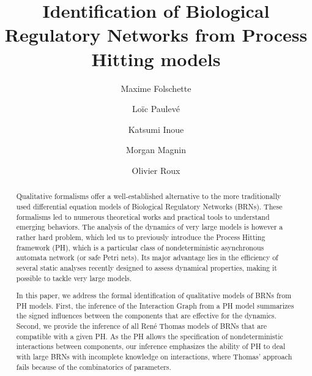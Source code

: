 \documentclass[preprint]{elsarticle}
\def\modMF#1{\textcolor{teal}{#1}}
\def\modLP#1{\textcolor{magenta}{#1}}
\def\modMM#1{\textcolor{blue}{#1}}
\def\modOR#1{\textcolor{olive}{#1}}
\def\modMF#1{#1} \def\modLP#1{#1} \def\modMM#1{#1} \def\modOR#1{#1}
\begin{document}
\begin{frontmatter}

\title{\modLP{Identification of} Biological Regulatory Networks from Process Hitting models}

\author[irccyn,nii]{Maxime Folschette}
\author[lri]{Lo\"ic Paulev\'e}
\author[nii]{Katsumi Inoue}
\author[irccyn,nii]{Morgan Magnin}
\author[irccyn]{Olivier Roux}

\address[irccyn]{LUNAM Universit\'e, \'Ecole Centrale de Nantes, IRCCyN UMR CNRS 6597\\
(Institut de Recherche en Communications et Cybern\'etique de Nantes)\\
1 rue de la No\"e - B.P. 92101 - 44321 Nantes Cedex 3, France.}
\address[nii]{National Institute of Informatics,\\
2-1-2, Hitotsubashi, Chiyoda-ku, Tokyo 101-8430, Japan.}
\address[lri]{CNRS, Laboratoire de Recherche en Informatique UMR CNRS 8623\\
Universit\'e Paris-Sud, 91405 Orsay Cedex, France}


\begin{abstract}
\modOR{Qualitative formalisms offer a well-established alternative to the more traditionally used differential equation models of Biological Regulatory Networks (BRNs). These formalisms led to numerous theoretical works and practical tools to understand emerging behaviors.} \modMM{The analysis of the dynamics of very large models is however a rather hard problem, which led us to previously introduce} \modMF{the Process Hitting framework (PH),} \modMM{which} \modLP{is a particular class of nondeterministic asynchronous automata
network (or safe Petri nets).} \modMM{Its major advantage lies in the efficiency of several static analyses recently designed to assess dynamical properties, making it possible to tackle very large models.}

\modLP{In this paper, we address the formal identification of qualitative
models of BRNs from PH models.}
First, the inference of the Interaction Graph from a PH model
\modLP{summarizes the signed influences between the components} that are effective for the dynamics.
Second, we provide the inference of all Ren\'e Thomas models of BRNs 
that are compatible with a given PH.
As the PH allows the specification of nondeterministic interactions between
components, our inference emphasizes the ability of PH to deal with large BRNs with incomplete knowledge
on interactions, where Thomas' approach fails because of the combinatorics of parameters.


\end{abstract}
\end{frontmatter}
\end{document}
